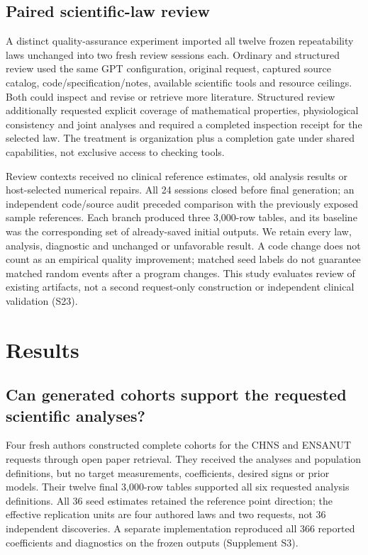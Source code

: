 \documentclass[11pt,letterpaper]{article}
\begin{document}
\subsection{Paired scientific-law review}

A distinct quality-assurance experiment imported all twelve frozen repeatability laws unchanged into two fresh review sessions each. Ordinary and structured review used the same GPT configuration, original request, captured source catalog, code/\allowbreak{}specification/\allowbreak{}notes, available scientific tools and resource ceilings. Both could inspect and revise or retrieve more literature. Structured review additionally requested explicit coverage of mathematical properties, physiological consistency and joint analyses and required a completed inspection receipt for the selected law. The treatment is organization plus a completion gate under shared capabilities, not exclusive access to checking tools.


Review contexts received no clinical reference estimates, old analysis results or host-selected numerical repairs. All 24 sessions closed before final generation; an independent code/\allowbreak{}source audit preceded comparison with the previously exposed sample references. Each branch produced three 3,000-row tables, and its baseline was the corresponding set of already-saved initial outputs. We retain every law, analysis, diagnostic and unchanged or unfavorable result. A code change does not count as an empirical quality improvement; matched seed labels do not guarantee matched random events after a program changes. This study evaluates review of existing artifacts, not a second request-only construction or independent clinical validation (S23).


\section{Results}

\subsection{Can generated cohorts support the requested scientific analyses?}

Four fresh authors constructed complete cohorts for the CHNS and ENSANUT requests through open paper retrieval. They received the analyses and population definitions, but no target measurements, coefficients, desired signs or prior models. Their twelve final 3,000-row tables supported all six requested analysis definitions. All 36 seed estimates retained the reference point direction; the effective replication units are four authored laws and two requests, not 36 independent discoveries. A separate implementation reproduced all 366 reported coefficients and diagnostics on the frozen outputs (Supplement S3).
\end{document}
